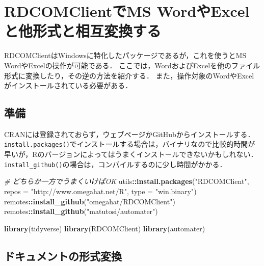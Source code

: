 \documentclass[
]{article}
\newenvironment{Shaded}{\begin{snugshade}}{\end{snugshade}}
\newcommand{\AttributeTok}[1]{\textcolor[rgb]{0.13,0.29,0.53}{#1}}
\newcommand{\CommentTok}[1]{\textcolor[rgb]{0.56,0.35,0.01}{\textit{#1}}}
\newcommand{\FunctionTok}[1]{\textcolor[rgb]{0.13,0.29,0.53}{\textbf{#1}}}
\newcommand{\NormalTok}[1]{#1}
\newcommand{\SpecialCharTok}[1]{\textcolor[rgb]{0.81,0.36,0.00}{\textbf{#1}}}
\newcommand{\StringTok}[1]{\textcolor[rgb]{0.31,0.60,0.02}{#1}}
\begin{document}
\hypertarget{RDCOMClient}{%
\section{RDCOMClientでMS WordやExcelと他形式と相互変換する}\label{RDCOMClient}}

RDCOMClientはWindowsに特化したパッケージであるが，これを使うとMS WordやExcelの操作が可能である．
ここでは，WordおよびExcelを他のファイル形式に変換したり，その逆の方法を紹介する．
また，操作対象のWordやExcelがインストールされている必要がある．

\hypertarget{ux6e96ux5099-16}{%
\subsection{準備}\label{ux6e96ux5099-16}}

CRANには登録されておらず，ウェブページかGitHubからインストールする．
\texttt{install.packages()}でインストールする場合は，バイナリなので比較的時間が早いが，Rのバージョンによってはうまくインストールできないかもしれない．
\texttt{install\_github()}の場合は，コンパイルするのに少し時間がかかる．

\begin{Shaded}
\begin{Highlighting}[]
  \CommentTok{\# どちらか一方でうまくいけばOK}
\NormalTok{utils}\SpecialCharTok{::}\FunctionTok{install.packages}\NormalTok{(}\StringTok{"RDCOMClient"}\NormalTok{, }\AttributeTok{repos =} \StringTok{"http://www.omegahat.net/R"}\NormalTok{, }\AttributeTok{type =} \StringTok{"win.binary"}\NormalTok{)}
\NormalTok{remotes}\SpecialCharTok{::}\FunctionTok{install\_github}\NormalTok{(}\StringTok{"omegahat/RDCOMClient"}\NormalTok{)}
\NormalTok{remotes}\SpecialCharTok{::}\FunctionTok{install\_github}\NormalTok{(}\StringTok{"matutosi/automater"}\NormalTok{)}
\end{Highlighting}
\end{Shaded}

\begin{Shaded}
\begin{Highlighting}[]
\FunctionTok{library}\NormalTok{(tidyverse)}
\FunctionTok{library}\NormalTok{(RDCOMClient)}
\FunctionTok{library}\NormalTok{(automater)}
\end{Highlighting}
\end{Shaded}

\hypertarget{ux30c9ux30adux30e5ux30e1ux30f3ux30c8ux306eux5f62ux5f0fux5909ux63db}{%
\subsection{ドキュメントの形式変換}\label{ux30c9ux30adux30e5ux30e1ux30f3ux30c8ux306eux5f62ux5f0fux5909ux63db}}
\end{document}
